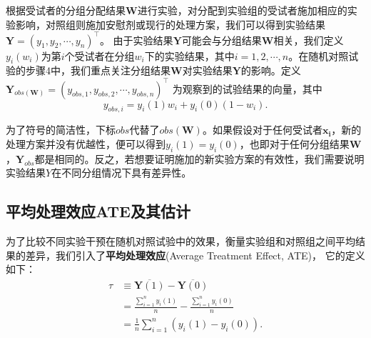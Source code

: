 根据受试者的分组分配结果$\mathbf{W}$进行实验，对分配到实验组的受试者施加相应的实验影响，对照组则施加安慰剂或现行的处理方案，我们可以得到实验结果$\mathbf{Y}=(y_1, y_2, \cdots, y_n)^{\top}$。 由于实验结果$\mathbf{Y}$可能会与分组结果$\mathbf{W}$相关，我们定义$y_i(w_i)$为第$i$个受试者在分组$w_i$下的实验结果，其中$i=1, 2, \cdots, n$。在随机对照试验的步骤4中，我们重点关注分组结果$\mathbf{W}$对实验结果$\mathbf{Y}$的影响。定义 $\mathbf{Y}_{o b s(\mathbf{W})}=(y_{obs, 1}, y_{obs, 2}, \cdots, y_{obs, n})^{\top}$ 为观察到的试验结果的向量，其中
\begin{equation}
    y_{obs, i}=y_i(1) w_i+y_i(0)\left(1-w_i\right).
\end{equation}


为了符号的简洁性，下标$obs$代替了$obs(\mathbf{W})$。如果假设对于任何受试者$\mathbf{x_i}$，新的处理方案并没有优越性，便可以得到$y_i(1) = y_i(0)$，也即对于任何分组结果$\mathbf{W}$，$\mathbf{Y}_{obs}$都是相同的。反之，若想要证明施加的新实验方案的有效性，我们需要说明实验结果$Y$在不同分组情况下具有差异性。
\subsection{平均处理效应ATE及其估计}

为了比较不同实验干预在随机对照试验中的效果，衡量实验组和对照组之间平均结果的差异，我们引入了\textbf{平均处理效应}(Average Treatment Effect, ATE)\cite{doi:10.1080/01621459.1986.10478354}， 它的定义如下：
\begin{equation}\label{Average Treatment Effect}
\begin{aligned}
\tau & \equiv \overline{\mathbf{Y}(1)}-\overline{\mathbf{Y}(0)} \\
& =\frac{\sum _{i=1}^n y_i(1)}{n}-\frac{\sum _{i=1}^n y_i(0)}{n} \\
& = \frac{1}{n}\sum _{i=1}^n\left(y_i(1)-y_i(0)\right).
\end{aligned}
\end{equation}

